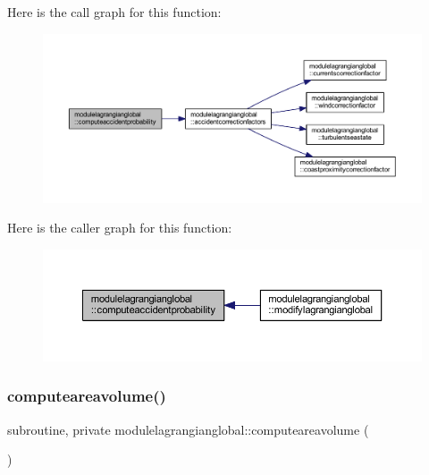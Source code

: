 Here is the call graph for this function\+:\nopagebreak
\begin{figure}[H]
\begin{center}
\leavevmode
\includegraphics[width=350pt]{namespacemodulelagrangianglobal_ab4d5d4f0cabe63a2e5fc1e9349f8425d_cgraph}
\end{center}
\end{figure}
Here is the caller graph for this function\+:\nopagebreak
\begin{figure}[H]
\begin{center}
\leavevmode
\includegraphics[width=350pt]{namespacemodulelagrangianglobal_ab4d5d4f0cabe63a2e5fc1e9349f8425d_icgraph}
\end{center}
\end{figure}
\mbox{\label{namespacemodulelagrangianglobal_ad6190c60927cd9e871e45fcfd4fc5dd2}} 
\subsubsection{\texorpdfstring{computeareavolume()}{computeareavolume()}}
{\footnotesize\ttfamily subroutine, private modulelagrangianglobal\+::computeareavolume (\begin{DoxyParamCaption}{ }\end{DoxyParamCaption})\hspace{0.3cm}{\ttfamily [private]}}

